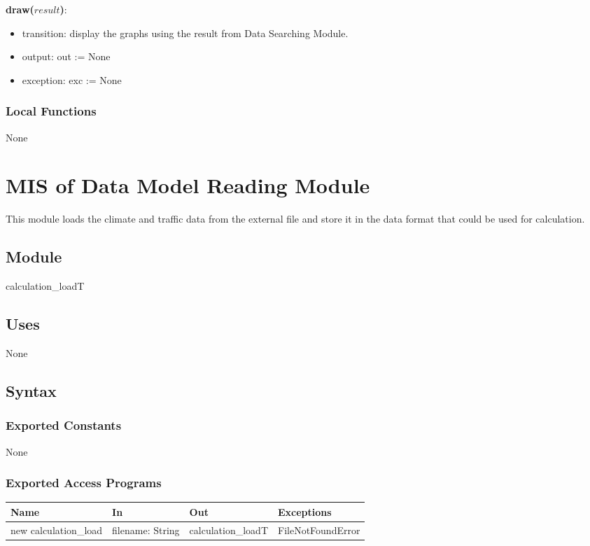 \documentclass[12pt, titlepage]{article}
\begin{document}
\noindent \textbf{draw($result$)}:
\begin{itemize}
\item transition: display the graphs using the result from Data Searching Module.
\item output: out := None
\item exception: exc := None
\end{itemize}

\subsubsection{Local Functions}
None
\newpage


\section{MIS of Data Model Reading Module} \label{dataModelReadingModule}
This module loads the climate and traffic data from the external file and store it in the data format that could be used for calculation.

\subsection{Module}
calculation\_loadT

\subsection{Uses}

None


\subsection{Syntax}

\subsubsection{Exported Constants}
None
\subsubsection{Exported Access Programs}

\begin{center}
\begin{tabular}{p{4cm} p{3cm} p{4cm} p{4cm}}
\hline
\textbf{Name} & \textbf{In} & \textbf{Out} & \textbf{Exceptions} \\
\hline
new calculation\_load & filename: String & calculation\_loadT & FileNotFoundError \\
\hline
\end{tabular}
\end{center}
\end{document}
